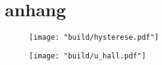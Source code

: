 \section{anhang}

\begin{figure}
    \centering
    \texttt{[image: "build/hysterese.pdf"]}
 \end{figure}

 
\begin{figure}
   \centering
    \texttt{[image: "build/u\_hall.pdf"]}
 \end{figure}
